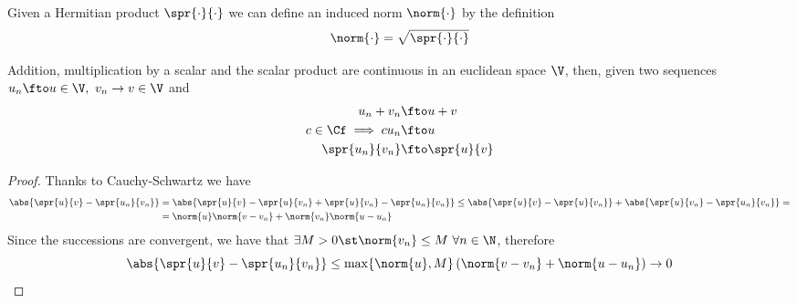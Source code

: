 \documentclass[../mmf.tex]{subfiles}
\begin{document}
\begin{thm}
	Given a Hermitian product $\spr{\cdot}{\cdot}$ we can define an induced norm $\norm{\cdot}$ by the definition
	\begin{equation}
		\norm{\cdot}=\sqrt{\spr{\cdot}{\cdot}}
		\label{eq:indnorm}
	\end{equation}
\end{thm}
\begin{thm}
	Addition, multiplication by a scalar and the scalar product are continuous in an euclidean space $\V$, then, given two sequences $u_n\fto u\in\V,\ v_n\to v\in\V$ and
	\begin{equation*}
		\begin{aligned}
			u_n+v_n&\fto u+v\\
			c\in\Cf\implies{} cu_n&\fto u\\
			\spr{u_n}{v_n}&\fto\spr{u}{v}
		\end{aligned}
	\end{equation*}
\end{thm}
\begin{proof}
	Thanks to Cauchy-Schwartz we have
	\begin{equation*}
		\begin{aligned}
			\abs{\spr{u}{v}-\spr{u_n}{v_n}}&=\abs{\spr{u}{v}-\spr{u}{v_n}+\spr{u}{v_n}-\spr{u_n}{v_n}}\le\abs{\spr{u}{v}-\spr{u}{v_n}}+\abs{\spr{u}{v_n}-\spr{u_n}{v_n}}=\\
			&=\norm{u}\norm{v-v_n}+\norm{v_n}\norm{u-u_n}
		\end{aligned}
	\end{equation*}
	Since the successions are convergent, we have that $\exists M>0\st\norm{v_n}\le M\ \forall n\in\N$, therefore
	\begin{equation*}
		\abs{\spr{u}{v}-\spr{u_n}{v_n}}\le\max\{\norm{u},M\}\left( \norm{v-v_n}+\norm{u-u_n} \right)\to0
	\end{equation*}
\end{proof}
\end{document}
